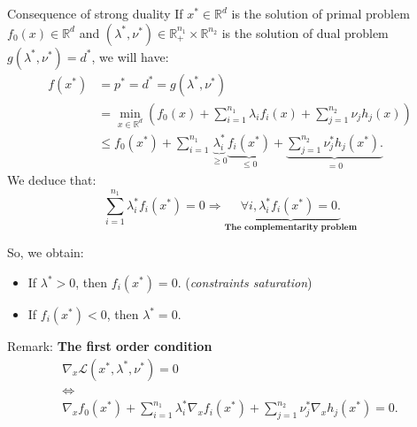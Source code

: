 \documentclass[unknownkeysallowed]{beamer}
\begin{document}
\begin{frame}{Consequence of strong duality}
        If $x^* \in \mathbb{R}^d$ is the solution of primal problem $f_0(x)\in\mathbb{R}^d$ and $(\lambda^*,\nu^*) \in \mathbb{R}_{+}^{n_1} \times \mathbb{R}^{n_2}$ is the solution of dual problem $g(\lambda^*,\nu^*)=d^*$, we will have:
        \begin{align*}
            f(x^*) &= p^* = d^* = g(\lambda^*,\nu^*) \\
                   &= \min_{x\in\mathbb{R}^d} (f_0 (x) + \sum_{i=1}^{n_1} \lambda_i f_i(x) + \sum_{j=1}^{n_2} \nu_j h_j(x)) \\
                   &\leq f_0 (x^*) + \sum_{i=1}^{n_1} \underbrace{\lambda_i^*}_{\geq 0} \underbrace{f_i(x^*)}_{\leq 0} + \underbrace{\sum_{j=1}^{n_2} \nu_j^* h_j(x^*).}_{=0}
        \end{align*}
        We deduce that:
        $$
        \sum_{i=1}^{n_1} \lambda_i^* f_i(x^*) = 0 \Longrightarrow  \underbrace{\forall i, \lambda_i^* f_i(x^*) = 0.}_{\textbf{The complementarity problem}}
        $$
\end{frame}
\begin{frame}
  So, we obtain:
   \begin{itemize}
        \item If $\lambda^* > 0$, then $f_i(x^*) = 0$. (\textit{constraints saturation})
        \item If $f_i(x^*) < 0$, then $\lambda^* = 0$.
    \end{itemize}

    \vspace{1cm}
    \begin{block}{Remark: \textbf{The first order condition}}
        \begin{gather*}
            \nabla_x \mathcal{L} (x^*, \lambda^*, \nu^*) = 0 \\
            \Longleftrightarrow \\
            \nabla_x f_0 (x^*) + \sum_{i=1}^{n_1} \lambda_i^* \nabla_x f_i(x^*) + \sum_{j=1}^{n_2} \nu_j^* \nabla_x h_j(x^*) = 0.
        \end{gather*}

   \end{block}
\end{frame}
\end{document}
